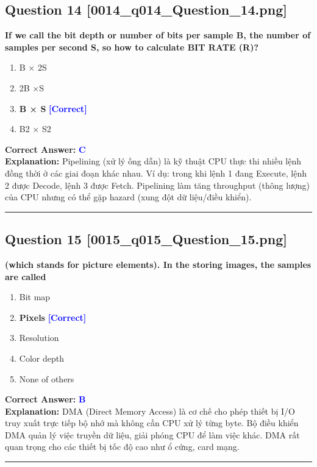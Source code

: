 \documentclass[11pt,a4paper]{article}
\begin{document}
\begin{minipage}{\textwidth}
\subsection*{Question 14 \quad \footnotesize{[0014\_q014\_Question\_14.png]}}
\noindent \textbf{If we call the bit depth or number of bits per sample B, the number of samples per second S, so how to calculate BIT RATE (R)?}

\begin{enumerate}[label=\Alph*.]
    \item B × 2S
    \item 2B ×S
    \item \textbf{B × S} \hfill \textcolor{blue}{\textbf{[Correct]}}
    \item B2 × S2
\end{enumerate}

\noindent \textbf{Correct Answer:} \textcolor{blue}{\textbf{C}} \\[2pt]
\noindent \textbf{Explanation:} Pipelining (xử lý ống dẫn) là kỹ thuật CPU thực thi nhiều lệnh đồng thời ở các giai đoạn khác nhau. Ví dụ: trong khi lệnh 1 đang Execute, lệnh 2 được Decode, lệnh 3 được Fetch. Pipelining làm tăng throughput (thông lượng) của CPU nhưng có thể gặp hazard (xung đột dữ liệu/điều khiển).

\par\vspace{0.3cm}
\hrule
\vspace{0.3cm}
\end{minipage}

\begin{minipage}{\textwidth}
\subsection*{Question 15 \quad \footnotesize{[0015\_q015\_Question\_15.png]}}
\noindent \textbf{(which stands for picture elements). In the storing images, the samples are called}

\begin{enumerate}[label=\Alph*.]
    \item Bit map
    \item \textbf{Pixels} \hfill \textcolor{blue}{\textbf{[Correct]}}
    \item Resolution
    \item Color depth
    \item None of others
\end{enumerate}

\noindent \textbf{Correct Answer:} \textcolor{blue}{\textbf{B}} \\[2pt]
\noindent \textbf{Explanation:} DMA (Direct Memory Access) là cơ chế cho phép thiết bị I/O truy xuất trực tiếp bộ nhớ mà không cần CPU xử lý từng byte. Bộ điều khiển DMA quản lý việc truyền dữ liệu, giải phóng CPU để làm việc khác. DMA rất quan trọng cho các thiết bị tốc độ cao như ổ cứng, card mạng.

\par\vspace{0.3cm}
\hrule
\vspace{0.3cm}
\end{minipage}
\end{document}
